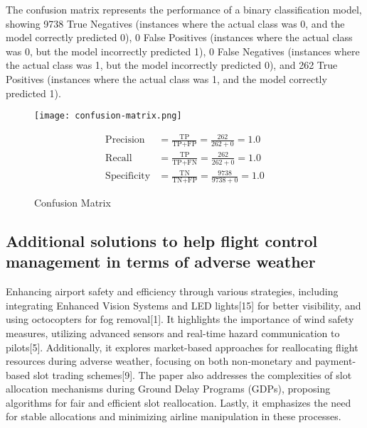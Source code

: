 \documentclass[conference]{IEEEtran}
\begin{document}
 
The confusion matrix represents the performance of a binary classification model, showing 9738 True Negatives (instances where the actual class was 0, and the model correctly predicted 0), 0 False Positives (instances where the actual class was 0, but the model incorrectly predicted 1), 0 False Negatives (instances where the actual class was 1, but the model incorrectly predicted 0), and 262 True Positives (instances where the actual class was 1, and the model correctly predicted 1).
\begin{figure} [htbp]
    \centering
    \texttt{[image: confusion-matrix.png]} %
    \caption{Confusion Matrix}
    \label{fig:3}


\noindent
\begin{align*}
\text{Precision} &= \frac{\text{TP}}{\text{TP} + \text{FP}} = \frac{262}{262 + 0} = 1.0 \\
\text{Recall} &= \frac{\text{TP}}{\text{TP} + \text{FN}} = \frac{262}{262 + 0} = 1.0 \\
\text{Specificity} &= \frac{\text{TN}}{\text{TN} + \text{FP}} = \frac{9738}{9738 + 0} = 1.0
\end{align*}

\end{figure}
\subsection{Additional solutions to help flight control management in terms of adverse weather}\label{subsec5}
\noindent Enhancing airport safety and efficiency through various strategies, including integrating Enhanced Vision Systems and LED lights[15] for better visibility, and using octocopters for fog removal[1]. It highlights the importance of wind safety measures, utilizing advanced sensors and real-time hazard communication to pilots[5]. Additionally, it explores market-based approaches for reallocating flight resources during adverse weather, focusing on both non-monetary and payment-based slot trading schemes[9]. The paper also addresses the complexities of slot allocation mechanisms during Ground Delay Programs (GDPs), proposing algorithms for fair and efficient slot reallocation. Lastly, it emphasizes the need for stable allocations and minimizing airline manipulation in these processes.
\end{document}
